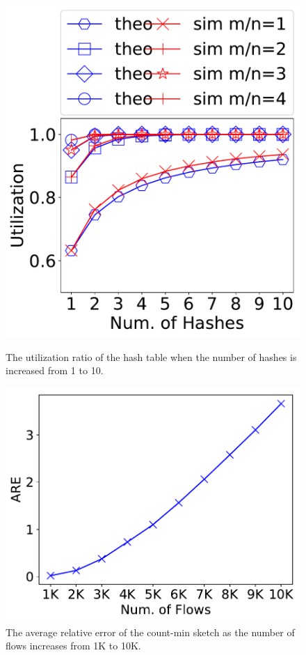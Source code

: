 \begin{figure}
    \centering
    \begin{minipage}{0.24\textwidth}
        \centering
        \includegraphics[width=\linewidth]{figures/exp84481/hash_table_utilization}
        \caption{The utilization ratio of the hash table when the number of hashes is increased from 1 to 10.}
        \label{fig:cachehitratio}
    \end{minipage}
    \begin{minipage}{0.24\textwidth}
        \centering
        \includegraphics[width=\linewidth]{figures/exp84482/count_min_sketch_are}
        \caption{The average relative error of the count-min sketch as the number of flows increases from 1K to 10K.}
        \label{fig:countminsketchare}
    \end{minipage}
\end{figure}

